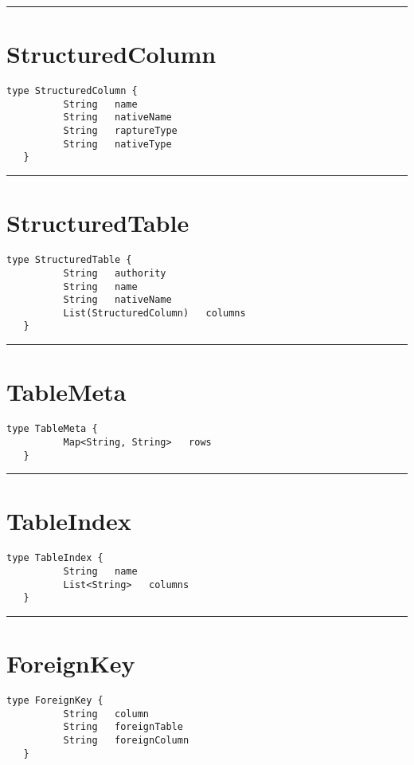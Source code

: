 \rule{12cm}{2pt}
\section{StructuredColumn}
\label{type:StructuredColumn}

\begin{lstlisting}[style=nonumbers]
   type StructuredColumn {
          String   name
          String   nativeName
          String   raptureType
          String   nativeType
   }
\end{lstlisting}

\rule{12cm}{2pt}
\section{StructuredTable}
\label{type:StructuredTable}

\begin{lstlisting}[style=nonumbers]
   type StructuredTable {
          String   authority
          String   name
          String   nativeName
          List(StructuredColumn)   columns
   }
\end{lstlisting}

\rule{12cm}{2pt}
\section{TableMeta}
\label{type:TableMeta}

\begin{lstlisting}[style=nonumbers]
   type TableMeta {
          Map<String, String>   rows
   }
\end{lstlisting}

\rule{12cm}{2pt}
\section{TableIndex}
\label{type:TableIndex}

\begin{lstlisting}[style=nonumbers]
   type TableIndex {
          String   name
          List<String>   columns
   }
\end{lstlisting}

\rule{12cm}{2pt}
\section{ForeignKey}
\label{type:ForeignKey}

\begin{lstlisting}[style=nonumbers]
   type ForeignKey {
          String   column
          String   foreignTable
          String   foreignColumn
   }
\end{lstlisting}

